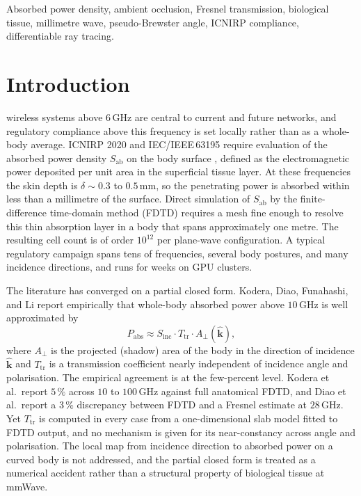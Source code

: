 \documentclass[journal,twocolumn,10pt]{IEEEtran}
\theoremstyle{plain}
\theoremstyle{remark}
\newcommand{\khat}{\hat{\bm{k}}}
\newcommand{\Sinc}{S_{\mathrm{inc}}}
\newcommand{\Sab}{S_{\mathrm{ab}}}
\begin{document}
\begin{IEEEkeywords}
Absorbed power density, ambient occlusion, Fresnel transmission,
biological tissue, millimetre wave, pseudo-Brewster angle, ICNIRP
compliance, differentiable ray tracing.
\end{IEEEkeywords}

\IEEEpeerreviewmaketitle


\section{Introduction}\label{sec:introduction}
 wireless systems above $6\,$GHz are
central to current and future networks, and regulatory compliance
above this frequency is set locally rather than as a whole-body
average. ICNIRP 2020 and IEC/IEEE\,63195 require evaluation of the
absorbed power density $\Sab$ on the body surface
\cite{ICNIRP2020}, defined as the electromagnetic power deposited
per unit area in the superficial tissue layer. At these frequencies
the skin depth is $\delta \sim 0.3$ to $0.5\,$mm, so the penetrating
power is absorbed within less than a millimetre of the surface.
Direct simulation of $\Sab$ by the finite-difference time-domain
method (FDTD) requires a mesh fine enough to resolve this thin
absorption layer in a body that spans approximately one metre. The
resulting cell count is of order $10^{12}$ per plane-wave
configuration. A typical regulatory campaign spans tens of
frequencies, several body postures, and many incidence directions,
and runs for weeks on GPU clusters.

The literature has converged on a partial closed form. Kodera, Diao,
Funahashi, and Li \cite{Kodera2024,Diao2024,Funahashi2018,Li2019}
report empirically that whole-body absorbed power above
$10\,$GHz is well approximated by
\begin{equation}\label{eq:Pabs-empirical}
  P_{\mathrm{abs}} \approx \Sinc \cdot T_{\mathrm{tr}}
  \cdot A_\perp(\khat),
\end{equation}
where $A_\perp$ is the projected (shadow) area of the body in the
direction of incidence $\khat$ and $T_{\mathrm{tr}}$ is a
transmission coefficient nearly independent of incidence angle and
polarisation. The empirical agreement is at the few-percent level.
Kodera et al.\ report $5\,\%$ across $10$ to $100\,$GHz against full
anatomical FDTD, and
Diao et al.\ report a $3\,\%$ discrepancy between FDTD and a Fresnel
estimate at $28\,$GHz. Yet $T_{\mathrm{tr}}$ is computed in every
case from a one-dimensional slab model fitted to FDTD output, and no
mechanism is given for its near-constancy across angle and
polarisation. The local map from incidence direction to absorbed
power on a curved body is not addressed, and the partial closed form
is treated as a numerical accident rather than a structural property
of biological tissue at mmWave.
\end{document}

